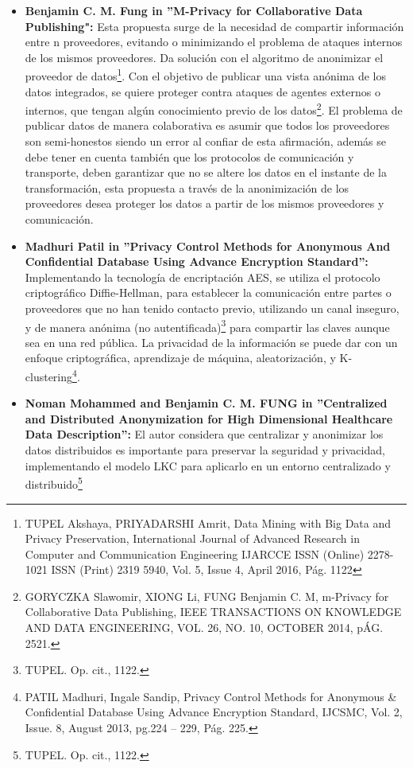 \documentclass[a4paper,openright,12pt]{book}
\theoremstyle{definition}
\theoremstyle{remark}
\begin{document}
\begin{itemize}
	\item \textbf{Benjamin C. M. Fung in ”M-Privacy for Collaborative Data Publishing":} Esta propuesta surge de la necesidad de compartir información entre n proveedores, evitando o minimizando el problema de ataques internos de los mismos proveedores. Da solución con el algoritmo de anonimizar el proveedor de datos\footnote{TUPEL Akshaya, PRIYADARSHI Amrit, Data Mining with Big Data and Privacy Preservation, International Journal of Advanced Research in Computer and Communication Engineering IJARCCE ISSN (Online) 2278-1021 ISSN (Print) 2319 5940,
Vol. 5, Issue 4, April 2016, Pág. 1122}. Con el objetivo de publicar una vista anónima de los datos integrados, se quiere proteger contra ataques de agentes externos o internos, que tengan algún conocimiento previo de los datos\footnote{GORYCZKA Slawomir, XIONG Li, FUNG Benjamin C. M, m-Privacy for Collaborative Data Publishing, IEEE TRANSACTIONS ON KNOWLEDGE AND DATA ENGINEERING, VOL. 26, NO. 10, OCTOBER 2014, pÁG. 2521.}. El problema de publicar datos de manera colaborativa es asumir que todos los proveedores son semi-honestos siendo un error al confiar de esta afirmación, además se debe tener en cuenta también que los protocolos de comunicación y transporte, deben garantizar que no se altere los datos en el instante de la transformación, esta propuesta a través de la anonimización de los proveedores desea proteger los datos a partir de los mismos proveedores y comunicación.
    \item \textbf{Madhuri Patil in ”Privacy Control Methods for Anonymous And Confidential Database Using Advance Encryption Standard”:} Implementando la tecnología de encriptación AES, se utiliza el protocolo criptográfico Diffie-Hellman, para establecer la comunicación entre partes o proveedores que no han tenido contacto previo, utilizando un canal inseguro, y de manera anónima (no autentificada)\footnote{TUPEL. Op. cit., 1122.} para compartir las claves aunque sea en una red pública. La privacidad de la información se puede dar con un enfoque criptográfica, aprendizaje de máquina, aleatorización, y K-clustering\footnote{PATIL Madhuri, Ingale Sandip, Privacy Control Methods for Anonymous \& Confidential Database Using Advance Encryption Standard, IJCSMC, Vol. 2, Issue. 8, August 2013, pg.224 – 229, Pág. 225.}.
    \item \textbf{Noman Mohammed and Benjamin C. M. FUNG in ”Centralized and Distributed Anonymization for High Dimensional Healthcare Data Description”:} El autor considera que centralizar y anonimizar los datos distribuidos es importante para preservar la seguridad y privacidad, implementando el modelo LKC para aplicarlo en un entorno centralizado y distribuido\footnote{TUPEL. Op. cit., 1122.}
\end{itemize}
\end{document}

